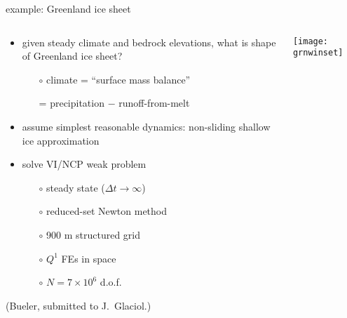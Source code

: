 \documentclass{beamer}
\begin{document}
\begin{frame}{example: Greenland ice sheet}

\begin{columns}
\begin{column}{0.6\textwidth}
\begin{itemize}
\small
\item given steady climate and bedrock elevations, what is shape of Greenland ice sheet?
  \begin{itemize}
  \scriptsize
  \item[$\circ$] climate = ``surface mass balance''
  \item[] \qquad = precipitation $-$ runoff-from-melt
  \end{itemize}
\small
\item assume simplest reasonable dynamics: non-sliding shallow ice approximation
\item solve VI/NCP weak problem
  \begin{itemize}
  \scriptsize
  \item[$\circ$] steady state ($\Delta t\to \infty$)
  \item[$\circ$] reduced-set Newton method
  \item[$\circ$] 900 m structured grid
  \item[$\circ$] $Q^1$ FEs in space
  \item[$\circ$] $N=7\times 10^6$ d.o.f.
  \end{itemize}
\end{itemize}

\vspace{5mm}
\tiny (Bueler, submitted to J.~Glaciol.)
\end{column}
\begin{column}{0.4\textwidth}
\vspace{-5mm}

\begin{center}
\texttt{[image: grnwinset]}
\end{center}
\end{column}
\end{columns}
\end{frame}
\end{document}
